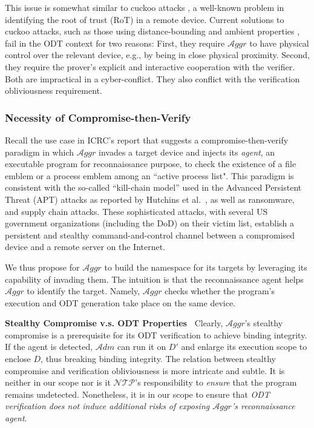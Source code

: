 \documentclass[letterpaper,twocolumn,10pt]{article}
\newcommand{\T}{\ensuremath{\mathcal{A}ggr}\xspace}
\newcommand{\N}{\ensuremath{\mathcal{N\!T}\mathcal{\!P}}\xspace}
\newcommand{\ADM}{\ensuremath{\mathcal{A}dm}\xspace}
\newcommand{\dn}{\ensuremath{D}\xspace}
\newcommand{\da}{\ensuremath{D'}\xspace}
\newcommand{\mypara}[1]{\vspace{.5em}\noindent\textbf{{#1}~}}
\begin{document}
This issue is somewhat similar to cuckoo attacks \cite{trust,presence_att}, a well-known problem
in identifying the root of trust (RoT) in a remote device.
Current solutions to cuckoo attacks, such as those using distance-bounding \cite{dhar2020proximitee} and
ambient properties \cite{presence_att}, fail in the ODT context for two reasons:
First, they require \T to have physical control over the relevant device, e.g., by being in close physical proximity.
Second, they require the prover's explicit and interactive cooperation with the verifier. Both are
impractical in a cyber-conflict. They also conflict with the verification obliviousness requirement.


\subsubsection{Necessity of Compromise-then-Verify}
Recall the use case in ICRC's report \cite{icrc} that suggests a compromise-then-verify paradigm in which \T
invades a target device and injects its \emph{agent}, an executable program for reconnaissance purpose, to check the existence of a file emblem or a process emblem among an ``active process list".
%
This paradigm is consistent with the so-called ``kill-chain model'' used in the Advanced Persistent Threat (APT)
attacks as reported by Hutchins et al.~\cite{hutchins2011intelligence}, as well as ransomware, and supply chain attacks.
These sophisticated attacks, with several US government organizations (including the DoD) on their victim list,
establish a persistent and stealthy command-and-control channel between a compromised device and a remote server
on the Internet.

We thus propose for \T to build the namespace for its targets by leveraging its capability of invading them.
The intuition is that the reconnaissance agent helps \T to identify the target. Namely, \T checks whether the
program's execution and ODT generation take place on the same device.

\mypara{Stealthy Compromise v.s. ODT Properties}
Clearly, \T's stealthy compromise is a prerequisite for its ODT verification to achieve binding integrity.
If the agent is detected, \ADM can run it on \da and enlarge its execution scope to enclose
\dn, thus breaking binding integrity.
The relation between stealthy compromise and verification obliviousness is more intricate and subtle.
It is neither in our scope nor is it \N's responsibility to \emph{ensure} that the program remains undetected.
Nonetheless, it is in our scope to ensure that \emph{ODT verification
does not induce additional risks of exposing \T's reconnaissance agent}.
\end{document}
